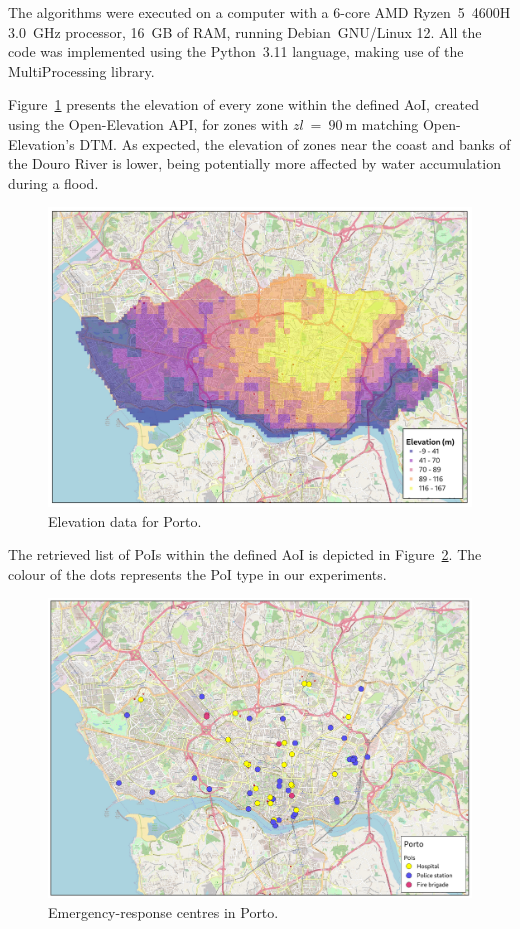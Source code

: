 \begin{refsection}
The algorithms were executed on a computer with a 6-core AMD Ryzen~5~4600H 3.0~GHz processor, 16~GB of RAM, running Debian~GNU/Linux 12. All the code was implemented using the Python~3.11 language, making use of the MultiProcessing library.

Figure~\ref{fig:porto_elevation} presents the elevation of every zone within the defined AoI, created using the Open-Elevation API, for zones with $zl~=~90~\mathrm{m}$ matching Open-Elevation's DTM. As expected, the elevation of zones near the coast and banks of the Douro River is lower, being potentially more affected by water accumulation during a flood.

\begin{figure}[h]
    \centering
    \includegraphics[width=0.85\linewidth]{Chapters/6-Flood/figs/porto_elevation.pdf}
    \caption{Elevation data for Porto.}
    \label{fig:porto_elevation}
\end{figure}

The retrieved list of PoIs within the defined AoI is depicted in Figure~\ref{fig:poisporto}. The colour of the dots represents the PoI type in our experiments. 

\begin{figure}[h]
    \centering
    \includegraphics[width=0.85\linewidth]{Chapters/6-Flood/figs/porto_pois.pdf}
    \caption{Emergency-response centres in Porto.}
    \label{fig:poisporto}
\end{figure}


\end{refsection}
